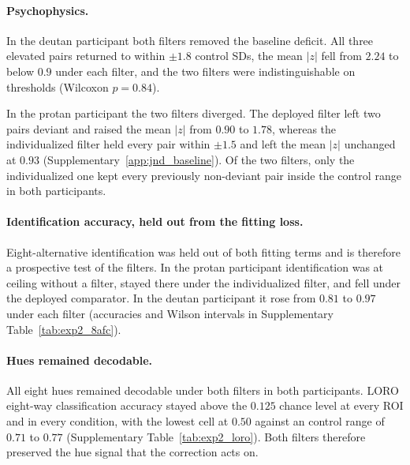 \paragraph{Psychophysics.}
In the deutan participant both filters removed the baseline deficit. All three elevated pairs returned to within $\pm 1.8$ control SDs, the mean $|z|$ fell from $2.24$ to below $0.9$ under each filter, and the two filters were indistinguishable on thresholds (Wilcoxon $p = 0.84$).

In the protan participant the two filters diverged. The deployed filter left two pairs deviant and raised the mean $|z|$ from $0.90$ to $1.78$, whereas the individualized filter held every pair within $\pm 1.5$ and left the mean $|z|$ unchanged at $0.93$ (Supplementary~\cref{app:jnd_baseline}). Of the two filters, only the individualized one kept every previously non-deviant pair inside the control range in both participants.

\paragraph{Identification accuracy, held out from the fitting loss.}
Eight-alternative identification was held out of both fitting terms and is therefore a prospective test of the filters. In the protan participant identification was at ceiling without a filter, stayed there under the individualized filter, and fell under the deployed comparator. In the deutan participant it rose from $0.81$ to $0.97$ under each filter (accuracies and Wilson intervals in Supplementary Table~\ref{tab:exp2_8afc}).

\paragraph{Hues remained decodable.}
All eight hues remained decodable under both filters in both participants. LORO eight-way classification accuracy stayed above the $0.125$ chance level at every ROI and in every condition, with the lowest cell at $0.50$ against an control range of $0.71$ to $0.77$ (Supplementary Table~\ref{tab:exp2_loro}). Both filters therefore preserved the hue signal that the correction acts on.

